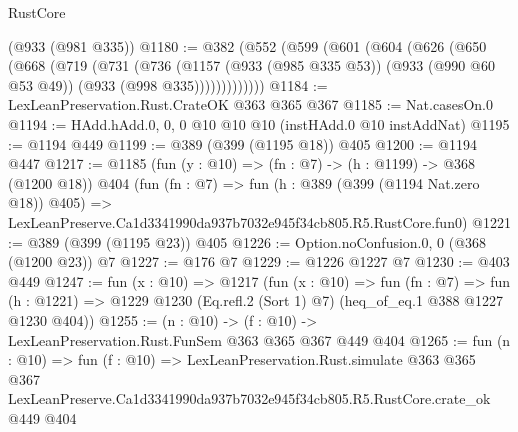 \begin{lexlean}{RustCore}
\begin{coremodule}
    (@933 (@981 @335))
@1180 := @382
    (@552
      (@599
        (@601
          (@604
            (@626
              (@650
                (@668
                  (@719
                    (@731
                      (@736
                        (@1157
                          (@933 (@985 @335 @53))
                          (@933 (@990 @60 @53 @49))
                          (@933 (@998 @335)))))))))))))
@1184 := LexLeanPreservation.Rust.CrateOK @363 @365 @367
@1185 := Nat.casesOn.{0}
@1194 := HAdd.hAdd.{0, 0, 0} @10 @10 @10 (instHAdd.{0} @10 instAddNat)
@1195 := @1194 @449
@1199 := @389 (@399 (@1195 @18)) @405
@1200 := @1194 @447
@1217 := @1185
    (fun (y : @10) => (fn : @7) -> (h : @1199) -> @368 (@1200 @18))
    @404
    (fun (fn : @7) =>
    fun (h : @389 (@399 (@1194 Nat.zero @18)) @405) =>
    LexLeanPreserve.Ca1d3341990da937b7032e945f34cb805.R5.RustCore.fun0)
@1221 := @389 (@399 (@1195 @23)) @405
@1226 := Option.noConfusion.{0, 0} (@368 (@1200 @23)) @7
@1227 := @176 @7
@1229 := @1226 @1227 @7
@1230 := @403 @449
@1247 := fun (x : @10) =>
  @1217
    (fun (x : @10) =>
    fun (fn : @7) =>
    fun (h : @1221) => @1229 @1230 (Eq.refl.{2} (Sort 1) @7) (heq_of_eq.{1} @388 @1227 @1230 @404))
@1255 := (n : @10) -> (f : @10) -> LexLeanPreservation.Rust.FunSem @363 @365 @367 @449 @404
@1265 := fun (n : @10) =>
  fun (f : @10) =>
  LexLeanPreservation.Rust.simulate
    @363
    @365
    @367
    LexLeanPreserve.Ca1d3341990da937b7032e945f34cb805.R5.RustCore.crate_ok
    @449
    @404
\end{coremodule}
\end{lexlean}
